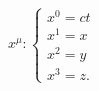 \documentclass[preview]{standalone}
\begin{document}
\begin{align*}
x^\mu : \begin{cases} x^0 = ct \\ x^1 = x \\ x^2 = y \\ x^3 =z. \end{cases}
\end{align*}
\end{document}
